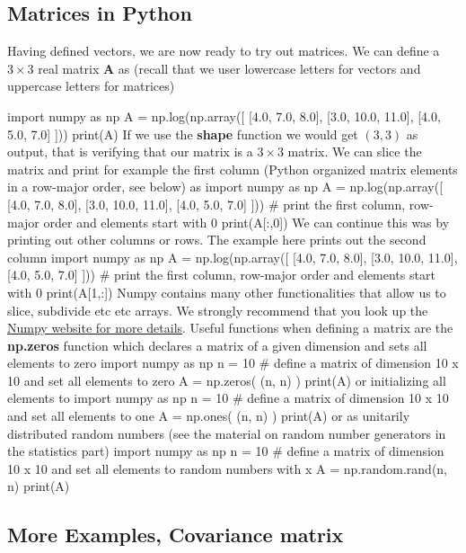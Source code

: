 \documentclass[%
oneside,                 %
final,                   %
10pt]{article}
\begin{document}
\subsection{Matrices in Python}

Having defined vectors, we are now ready to try out matrices. We can
define a $3 \times 3 $ real matrix $\bm{A}$ as (recall that we user
lowercase letters for vectors and uppercase letters for matrices)

\bpycod
import numpy as np
A = np.log(np.array([ [4.0, 7.0, 8.0], [3.0, 10.0, 11.0], [4.0, 5.0, 7.0] ]))
print(A)
\epycod
If we use the \textbf{shape} function we would get $(3, 3)$ as output, that is verifying that our matrix is a $3\times 3$ matrix. We can slice the matrix and print for example the first column (Python organized matrix elements in a row-major order, see below) as
\bpycod
import numpy as np
A = np.log(np.array([ [4.0, 7.0, 8.0], [3.0, 10.0, 11.0], [4.0, 5.0, 7.0] ]))
# print the first column, row-major order and elements start with 0
print(A[:,0]) 
\epycod
We can continue this was by printing out other columns or rows. The example here prints out the second column
\bpycod
import numpy as np
A = np.log(np.array([ [4.0, 7.0, 8.0], [3.0, 10.0, 11.0], [4.0, 5.0, 7.0] ]))
# print the first column, row-major order and elements start with 0
print(A[1,:]) 
\epycod
Numpy contains many other functionalities that allow us to slice, subdivide etc etc arrays. We strongly recommend that you look up the \href{{http://www.numpy.org/}}{Numpy website for more details}. Useful functions when defining a matrix are the \textbf{np.zeros} function which declares a matrix of a given dimension and sets all elements to zero
\bpycod
import numpy as np
n = 10
# define a matrix of dimension 10 x 10 and set all elements to zero
A = np.zeros( (n, n) )
print(A) 
\epycod
or initializing all elements to 
\bpycod
import numpy as np
n = 10
# define a matrix of dimension 10 x 10 and set all elements to one
A = np.ones( (n, n) )
print(A) 
\epycod
or as unitarily distributed random numbers (see the material on random number generators in the statistics part)
\bpycod
import numpy as np
n = 10
# define a matrix of dimension 10 x 10 and set all elements to random numbers with x \in [0, 1]
A = np.random.rand(n, n)
print(A) 
\epycod

\subsection{More Examples, Covariance matrix}
\end{document}
